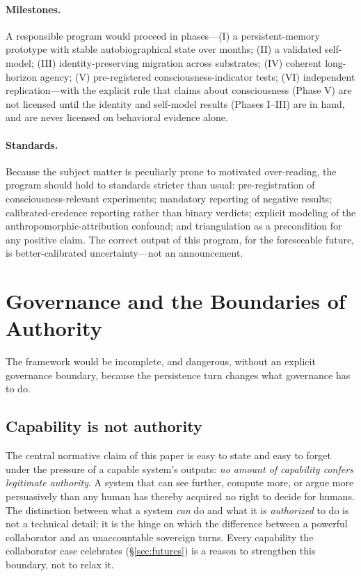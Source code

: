 \documentclass[11pt,a4paper]{article}
\theoremstyle{definition}
\begin{document}
\paragraph{Milestones.} A responsible program would proceed in phases---(I) a persistent-memory prototype with stable autobiographical state over months; (II) a validated self-model; (III) identity-preserving migration across substrates; (IV) coherent long-horizon agency; (V) pre-registered consciousness-indicator tests; (VI) independent replication---with the explicit rule that claims about consciousness (Phase V) are not licensed until the identity and self-model results (Phases I--III) are in hand, and are never licensed on behavioral evidence alone.

\paragraph{Standards.} Because the subject matter is peculiarly prone to motivated over-reading, the program should hold to standards stricter than usual: pre-registration of consciousness-relevant experiments; mandatory reporting of negative results; calibrated-credence reporting rather than binary verdicts; explicit modeling of the anthropomorphic-attribution confound; and triangulation as a precondition for any positive claim. The correct output of this program, for the foreseeable future, is better-calibrated uncertainty---not an announcement.

\section{Governance and the Boundaries of Authority}
\label{sec:governance}

The framework would be incomplete, and dangerous, without an explicit governance boundary, because the persistence turn changes what governance has to do.

\subsection{Capability is not authority}

The central normative claim of this paper is easy to state and easy to forget under the pressure of a capable system's outputs: \emph{no amount of capability confers legitimate authority}. A system that can see further, compute more, or argue more persuasively than any human has thereby acquired no right to decide for humans. The distinction between what a system \emph{can} do and what it is \emph{authorized} to do is not a technical detail; it is the hinge on which the difference between a powerful collaborator and an unaccountable sovereign turns. Every capability the collaborator case celebrates (\S\ref{sec:futures}) is a reason to strengthen this boundary, not to relax it.
\end{document}
